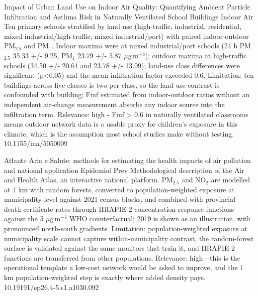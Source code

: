 \documentclass[10pt]{article}
\begin{document}
\par{}\baselineskip{}\baselineskip
{}

{Impact of Urban Land Use on Indoor Air Quality: Quantifying Ambient Particle Infiltration and Asthma Risk in Naturally Ventilated School Buildings}
{Indoor Air}
{Ten primary schools stratified by land use (high-traffic, industrial, residential, mixed industrial/high-traffic, mixed industrial/port) with paired indoor-outdoor PM$_{2.5}$ and PM$_{1}$. Indoor maxima were at mixed industrial/port schools (24 h PM$_{2.5}$ 35.33 +/- 9.25, PM$_{1}$ 23.79 +/- 5.87 $\mu$g\,m$^{-3}$); outdoor maxima at high-traffic schools (34.50 +/- 20.64 and 23.78 +/- 13.09); land-use class differences were significant (p<0.05) and the mean infiltration factor exceeded 0.6. Limitation: ten buildings across five classes is two per class, so the land-use contrast is confounded with building; Finf estimated from indoor-outdoor ratios without an independent air-change measurement absorbs any indoor source into the infiltration term. Relevance: high - Finf > 0.6 in naturally ventilated classrooms means outdoor network data is a usable proxy for children's exposure in this climate, which is the assumption most school studies make without testing.}
{10.1155/ina/5050009}

\par{}\baselineskip{}\baselineskip
{}

{Atlante Aria e Salute: methods for estimating the health impacts of air pollution and national application}
{Epidemiol Prev}
{Methodological description of the Air and Health Atlas, an interactive national platform. PM$_{2.5}$ and NO$_2$ are modelled at 1 km with random forests, converted to population-weighted exposure at municipality level against 2021 census blocks, and combined with provincial death-certificate rates through HRAPIE-2 concentration-response functions against the 5 $\mu$g\,m$^{-3}$ WHO counterfactual; 2019 is shown as an illustration, with pronounced north-south gradients. Limitation: population-weighted exposure at municipality scale cannot capture within-municipality contrast, the random-forest surface is validated against the same monitors that train it, and HRAPIE-2 functions are transferred from other populations. Relevance: high - this is the operational template a low-cost network would be asked to improve, and the 1 km population-weighted step is exactly where added density pays.}
{10.19191/ep26.4-5.s1.a1030.092}
\end{document}
